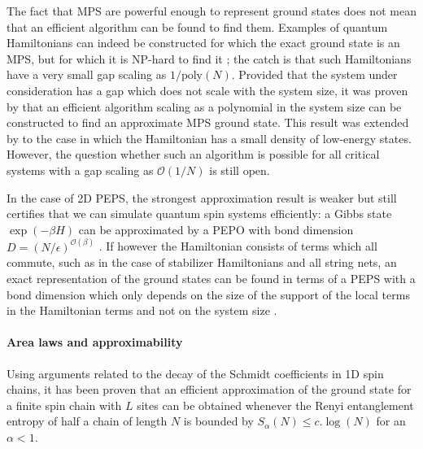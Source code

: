 \documentclass[rmp,aps,reprint,superscriptaddress,nobalancelastpage]{revtex4-1}
\begin{document}
The fact that MPS are powerful enough to represent ground states does not mean that an efficient algorithm can be found to find them. Examples of quantum Hamiltonians can indeed be constructed for which the exact ground state is an MPS, but for  which it is NP-hard to find it \cite{schuch:mps-gap-np}; the catch is that such Hamiltonians have a very small gap scaling as $1/\mathrm{poly}(N)$. Provided that the system under consideration has a gap which does not scale with the system size, it was proven by \citet*{landau:1d-efficient-algo} that an efficient algorithm scaling as a polynomial in the system size can be constructed to find an approximate MPS ground state. This result was extended by \citet{arad:rg-algorithms-and-area-laws} to the case in which the Hamiltonian has a small density of low-energy states. However, the question whether such an algorithm is possible for all critical systems with a gap scaling as $\mathcal{O}(1/N)$ is still open.

In the case of 2D PEPS, the strongest approximation result is weaker but still certifies that we can simulate quantum spin systems efficiently:  a Gibbs state $\exp(-\beta H)$ can be approximated by a PEPO with bond dimension $D=(N/\epsilon)^{\mathcal{O}(\beta)}$ \cite{hastings:locally,molnar:thermal-peps}. If however the Hamiltonian consists of terms which all commute, such as in the case of stabilizer Hamiltonians and all string nets, an exact representation of the ground states can be found in terms of a PEPS with a bond dimension which only depends on the size of the support of the local terms in the Hamiltonian terms and not on the system size \cite{verstraete:comp-power-of-peps}.


\paragraph{Area laws and approximability }

Using arguments related to the decay of the Schmidt coefficients in 1D spin chains, it has been proven that an efficient approximation of the ground state for a finite spin chain with $L$ sites can be obtained whenever the Renyi entanglement entropy of half a chain of length $N$ is bounded by $S_\alpha(N)\leq c.\log(N)$ for an $\alpha<1$.
\end{document}
